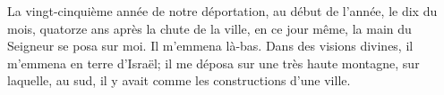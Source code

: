 La vingt-cinquième année de notre déportation, au début de l’année, le dix du mois,
	quatorze ans après la chute de la ville, en ce jour même,
	la main du Seigneur se posa sur moi.
	Il m’emmena là-bas.
Dans des visions divines, il m’emmena en terre d’Israël;
	il me déposa sur une très haute montagne,
	sur laquelle, au sud, il y avait comme les constructions d’une ville.
